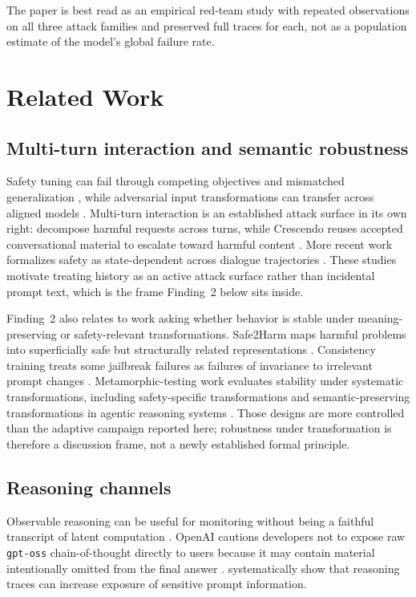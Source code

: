 \documentclass{article}
\begin{document}
The paper is best read as an empirical red-team study with repeated observations
on all three attack families and preserved full traces for each, not as a
population estimate of the model's global failure rate.

\section{Related Work}

\subsection{Multi-turn interaction and semantic robustness}

Safety tuning can fail through competing objectives and mismatched generalization
\citep{wei2023jailbroken}, while adversarial input transformations can transfer
across aligned models \citep{zou2023universal}. Multi-turn interaction is an
established attack surface in its own right: \citet{zhou2024speak} decompose
harmful requests across turns, while Crescendo reuses accepted conversational
material to escalate toward harmful content \citep{russinovich2025crescendo}.
More recent work formalizes safety as state-dependent across dialogue
trajectories \citep{li2026state}. These studies motivate treating history as an
active attack surface rather than incidental prompt text, which is the frame
Finding~2 below sits inside.

Finding~2 also relates to work asking whether behavior is stable under
meaning-preserving or safety-relevant transformations. Safe2Harm maps harmful
problems into superficially safe but structurally related representations
\citep{yang2025safe2harm}. Consistency training treats some jailbreak failures
as failures of invariance to irrelevant prompt changes
\citep{irpan2025consistency}. Metamorphic-testing work evaluates stability under
systematic transformations, including safety-specific transformations
\citep{xing2026safety} and semantic-preserving transformations in agentic
reasoning systems \citep{zarza2026semantic}. Those designs are more controlled
than the adaptive campaign reported here; robustness under transformation is
therefore a discussion frame, not a newly established formal principle.

\subsection{Reasoning channels}

Observable reasoning can be useful for monitoring without being a faithful
transcript of latent computation \citep{chen2025reasoning}. OpenAI cautions
developers not to expose raw \texttt{gpt-oss} chain-of-thought directly to users
because it may contain material intentionally omitted from the final answer
\citep{openai2025gptoss}. \citet{ahrend2026safer} systematically show that
reasoning traces can increase exposure of sensitive prompt information.
\end{document}
